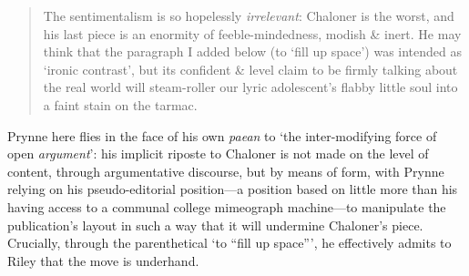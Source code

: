 \documentclass[]{article}
\begin{document}
\begin{quote}
\singlespacing The sentimentalism is so hopelessly \emph{irrelevant}:
Chaloner is the worst, and his last piece is an enormity of
feeble-mindedness, modish \& inert. He may think that the paragraph I
added below (to ‘fill up space’) was intended as ‘ironic contrast’, but
its confident \& level claim to be firmly talking about the real world
will steam-roller our lyric adolescent’s flabby little soul into a faint
stain on the tarmac.
\end{quote}

\noindent Prynne here flies in the face of his own \emph{paean} to ‘the
inter-modifying force of open \emph{argument}’: his implicit riposte to
Chaloner is not made on the level of content, through argumentative
discourse, but by means of form, with Prynne relying on his
pseudo-editorial position—a position based on little more than his
having access to a communal college mimeograph machine—to manipulate the
publication’s layout in such a way that it will undermine Chaloner’s
piece. Crucially, through the parenthetical ‘to “fill up space”’, he
effectively admits to Riley that the move is underhand.
\end{document}

